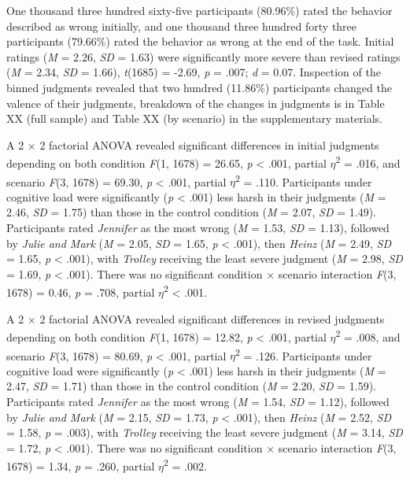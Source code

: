 \documentclass[
  american,
  man,floatsintext]{apa7}
\begin{document}
One thousand three hundred sixty-five participants (80.96\%) rated the behavior described as wrong initially, and one thousand three hundred forty three participants (79.66\%) rated the behavior as wrong at the end of the task. Initial ratings (\emph{M} = 2.26, \emph{SD} = 1.63) were significantly more severe than revised ratings (\emph{M} = 2.34, \emph{SD} = 1.66), \emph{t}(1685) = -2.69, \emph{p} = .007; \emph{d} = 0.07. Inspection of the binned judgments revealed that two hundred (11.86\%) participants changed the valence of their judgments, breakdown of the changes in judgments is in Table XX (full sample) and Table XX (by scenario) in the supplementary materials.

A 2 \(\times\) 2 factorial ANOVA revealed significant differences in initial judgments depending on both condition \emph{F}(1, 1678) = 26.65, \emph{p} \textless{} .001, partial \(\eta\)\textsuperscript{2} = .016, and scenario \emph{F}(3, 1678) = 69.30, \emph{p} \textless{} .001, partial \(\eta\)\textsuperscript{2} = .110. Participants under cognitive load were significantly (\emph{p} \textless{} .001) less harsh in their judgments (\emph{M} = 2.46, \emph{SD} = 1.75) than those in the control condition (\emph{M} = 2.07, \emph{SD} = 1.49). Participants rated \emph{Jennifer} as the most wrong (\emph{M} = 1.53, \emph{SD} = 1.13), followed by \emph{Julie and Mark} (\emph{M} = 2.05, \emph{SD} = 1.65, \emph{p} \textless{} .001), then \emph{Heinz} (\emph{M} = 2.49, \emph{SD} = 1.65, \emph{p} \textless{} .001), with \emph{Trolley} receiving the least severe judgment (\emph{M} = 2.98, \emph{SD} = 1.69, \emph{p} \textless{} .001). There was no significant condition \(\times\) scenario interaction \emph{F}(3, 1678) = 0.46, \emph{p} = .708, partial \(\eta\)\textsuperscript{2} \textless{} .001.

A 2 \(\times\) 2 factorial ANOVA revealed significant differences in revised judgments depending on both condition \emph{F}(1, 1678) = 12.82, \emph{p} \textless{} .001, partial \(\eta\)\textsuperscript{2} = .008, and scenario \emph{F}(3, 1678) = 80.69, \emph{p} \textless{} .001, partial \(\eta\)\textsuperscript{2} = .126. Participants under cognitive load were significantly (\emph{p} \textless{} .001) less harsh in their judgments (\emph{M} = 2.47, \emph{SD} = 1.71) than those in the control condition (\emph{M} = 2.20, \emph{SD} = 1.59). Participants rated \emph{Jennifer} as the most wrong (\emph{M} = 1.54, \emph{SD} = 1.12), followed by \emph{Julie and Mark} (\emph{M} = 2.15, \emph{SD} = 1.73, \emph{p} \textless{} .001), then \emph{Heinz} (\emph{M} = 2.52, \emph{SD} = 1.58, \emph{p} = .003), with \emph{Trolley} receiving the least severe judgment (\emph{M} = 3.14, \emph{SD} = 1.72, \emph{p} \textless{} .001). There was no significant condition \(\times\) scenario interaction \emph{F}(3, 1678) = 1.34, \emph{p} = .260, partial \(\eta\)\textsuperscript{2} = .002.
\end{document}
